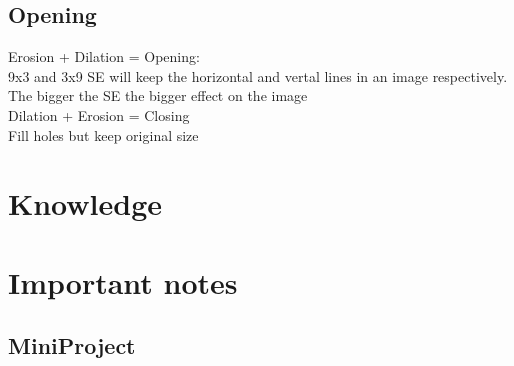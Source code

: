 \documentclass{article}
\begin{document}
\subsection{Opening}
Erosion + Dilation = Opening:\\
9x3 and 3x9 SE will keep the horizontal and vertal lines in an image respectively.\\
The bigger the SE the bigger effect on the image\\

Dilation + Erosion = Closing\\
Fill holes but keep original size\\


\section{Knowledge}


\section{Important notes}
\subsection{MiniProject}





\end{document}
